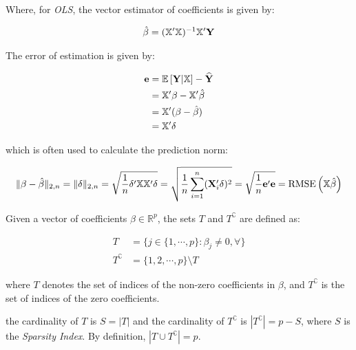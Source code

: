 Where, for \emph{OLS}, the vector estimator of coefficients is given by:

\begin{align*}
\hat{\beta} = (\mathbb{X}'\mathbb{X})^{-1}\mathbb{X}'\mathbf{Y}
\end{align*}

The error of estimation is given by:

\begin{align*}
\mathbf{e} &= \mathbb{E}\left[\mathbf{Y}|\mathbb{X}\right] - \widehat{\mathbf{Y}}\\
&= \mathbb{X}'\beta - \mathbb{X}'\hat{\beta}\\
&= \mathbb{X}'(\beta - \hat{\beta}) \\
&= \mathbb{X}'\delta
\end{align*}

which is often used to calculate the prediction norm:

\begin{align*}
\|\beta - \hat{\beta}\|_{2,n} 
    = \|\delta\|_{2,n} 
    = \sqrt{\frac{1}{n} \delta'\mathbb{X}\mathbb{X}'\delta} 
    = \sqrt{\frac{1}{n} \sum_{i=1}^{n} (\mathbf{X}_i'\delta)^2}
    = \sqrt{\frac{1}{n} \mathbf{e}'\mathbf{e}}
    = \text{RMSE}\left(\mathbb{X}\hat{\beta}\right)
\end{align*}

\begin{Def}
Given a vector of  coefficients $\beta \in \mathbb{R}^p$, the sets $T$ and $T^{\complement}$ are defined as:

\begin{align*}
T &= \lbrace
j \in \{1, \cdots, p \} : \beta_j \neq 0, \forall 
\rbrace  \\
T^{\complement} &= \{1, 2, \cdots, p\} \setminus T
\end{align*}

where $T$ denotes the set of indices of the non-zero coefficients in $\beta$, and $T^{\complement}$ is the set of indices of the zero coefficients.

the cardinality of $T$ is $S = |T|$ and the cardinality of $T^{\complement}$ is $|T^{\complement}| = p - S$, where $S$ is the \emph{Sparsity Index}. By definition, $|T \cup T^{\complement}| = p$.
\end{Def}

